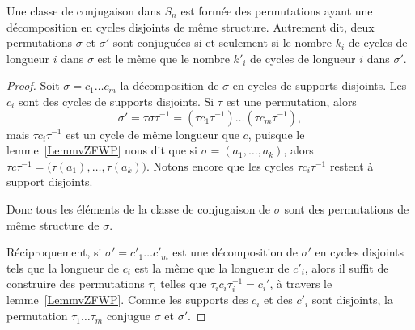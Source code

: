 \begin{proposition} \label{PropEAHWXwe}
    Une classe de conjugaison dans \( S_n\) est formée des permutations ayant une décomposition en cycles disjoints de même structure. Autrement dit, deux permutations \( \sigma\) et \( \sigma'\) sont conjuguées si et seulement si le nombre \( k_i\) de cycles de longueur \( i\) dans \( \sigma\) est le même que le nombre \( k'_i\) de cycles de longueur \( i\) dans \( \sigma'\).
\end{proposition}

\begin{proof}
    Soit \( \sigma=c_1\ldots c_m\) la décomposition de \( \sigma\) en cycles de supports disjoints. Les \( c_i\) sont des cycles de supports disjoints. Si \( \tau\) est une permutation, alors
    \begin{equation}
        \sigma'=\tau\sigma\tau^{-1}=(\tau c_1\tau^{-1})\ldots (\tau c_m\tau^{-1}),
    \end{equation}
    mais \( \tau c_i\tau^{-1}\) est un cycle de même longueur que \( c\), puisque le lemme~\ref{LemmvZFWP} nous dit que si \( \sigma=(a_1,\ldots, a_k)\), alors \( \tau c\tau^{-1}=\big( \tau(a_1),\ldots, \tau(a_k) \big)\). Notons encore que les cycles \( \tau c_i\tau^{-1}\) restent à support disjoints.

    Donc tous les éléments de la classe de conjugaison de \( \sigma\) sont des permutations de même structure de \( \sigma\).

    Réciproquement, si \( \sigma'=c'_1\ldots c'_m\) est une décomposition de \( \sigma'\) en cycles disjoints tels que la longueur de \( c_i\) est la même que la longueur de \( c'_i\), alors il suffit de construire des permutations \( \tau_i\) telles que \( \tau_i c_i\tau_i^{-1}=c_i'\), à travers le lemme~\ref{LemmvZFWP}. Comme les supports des $c_i$ et des $c'_i$ sont disjoints, la permutation \( \tau_1\ldots \tau_m\) conjugue \( \sigma\) et \( \sigma'\).
\end{proof}

